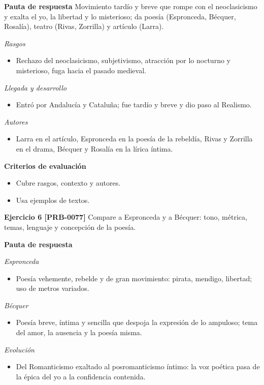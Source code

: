 \documentclass{book}
\begin{document}
\noindent\textbf{Pauta de respuesta}
Movimiento tardío y breve que rompe con el neoclasicismo y exalta el yo, la libertad y lo misterioso; da poesía (Espronceda, Bécquer, Rosalía), teatro (Rivas, Zorrilla) y artículo (Larra).


\noindent\textit{Rasgos}
\begin{itemize}
\item Rechazo del neoclasicismo, subjetivismo, atracción por lo nocturno y misterioso, fuga hacia el pasado medieval.
\end{itemize}

\noindent\textit{Llegada y desarrollo}
\begin{itemize}
\item Entró por Andalucía y Cataluña; fue tardío y breve y dio paso al Realismo.
\end{itemize}

\noindent\textit{Autores}
\begin{itemize}
\item Larra en el artículo, Espronceda en la poesía de la rebeldía, Rivas y Zorrilla en el drama, Bécquer y Rosalía en la lírica íntima.
\end{itemize}

\noindent\textbf{Criterios de evaluación}
\begin{itemize}
\item Cubre rasgos, contexto y autores.
\item Usa ejemplos de textos.
\end{itemize}

\noindent\textbf{Ejercicio 6 [PRB-0077]}
Compare a Espronceda y a Bécquer: tono, métrica, temas, lenguaje y concepción de la poesía.


\noindent\textbf{Pauta de respuesta}

\noindent\textit{Espronceda}
\begin{itemize}
\item Poesía vehemente, rebelde y de gran movimiento: pirata, mendigo, libertad; uso de metros variados.
\end{itemize}

\noindent\textit{Bécquer}
\begin{itemize}
\item Poesía breve, íntima y sencilla que despoja la expresión de lo ampuloso; tema del amor, la ausencia y la poesía misma.
\end{itemize}

\noindent\textit{Evolución}
\begin{itemize}
\item Del Romanticismo exaltado al posromanticismo íntimo: la voz poética pasa de la épica del yo a la confidencia contenida.
\end{itemize}
\end{document}
